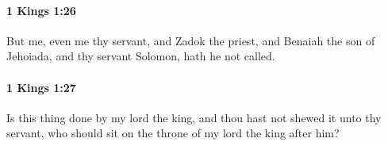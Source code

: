 		\paragraph{1 Kings 1:26} %
			\label{1KINGS-1-26}

			But me, even me thy servant, and Zadok the priest, and Benaiah the son of Jehoiada, and thy servant Solomon, hath he not called.


		\paragraph{1 Kings 1:27} %
			\label{1KINGS-1-27}

			Is this thing done by my lord the king, and thou hast not shewed it unto thy servant, who should sit on the throne of my lord the king after him?


